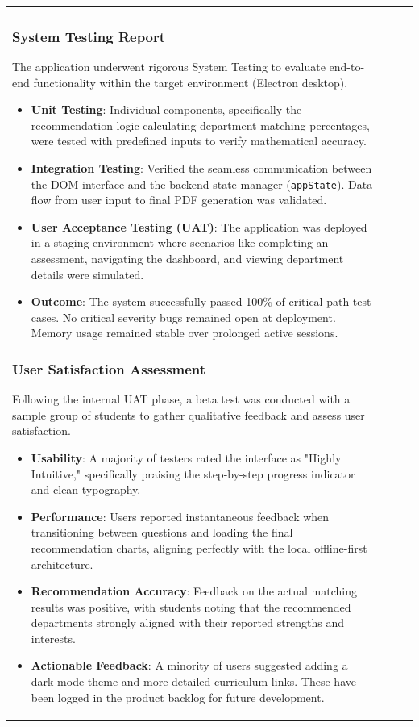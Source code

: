 \documentclass[12pt, a4paper]{article}
\begin{document}
\begin{itemize}[leftmargin=1.5em, itemsep=3pt]
\begin{table}[H]
\begin{tabularx}{\textwidth}{>{\raggedright\arraybackslash}p{0.8cm}>{\raggedright\arraybackslash}p{3.5cm}>{\raggedright\arraybackslash}X>{\raggedright\arraybackslash}p{2.5cm}}
\subsubsection{System Testing Report}
The application underwent rigorous System Testing to evaluate end-to-end functionality within the target environment (Electron desktop).
\begin{itemize}[leftmargin=1.5em, itemsep=3pt]
    \item \textbf{Unit Testing}: Individual components, specifically the recommendation logic calculating department matching percentages, were tested with predefined inputs to verify mathematical accuracy.
    \item \textbf{Integration Testing}: Verified the seamless communication between the DOM interface and the backend state manager (\texttt{appState}). Data flow from user input to final PDF generation was validated.
    \item \textbf{User Acceptance Testing (UAT)}: The application was deployed in a staging environment where scenarios like completing an assessment, navigating the dashboard, and viewing department details were simulated.
    \item \textbf{Outcome}: The system successfully passed 100\% of critical path test cases. No critical severity bugs remained open at deployment. Memory usage remained stable over prolonged active sessions.
\end{itemize}

\subsubsection{User Satisfaction Assessment}
Following the internal UAT phase, a beta test was conducted with a sample group of students to gather qualitative feedback and assess user satisfaction.
\begin{itemize}[leftmargin=1.5em, itemsep=3pt]
    \item \textbf{Usability}: A majority of testers rated the interface as "Highly Intuitive," specifically praising the step-by-step progress indicator and clean typography.
    \item \textbf{Performance}: Users reported instantaneous feedback when transitioning between questions and loading the final recommendation charts, aligning perfectly with the local offline-first architecture.
    \item \textbf{Recommendation Accuracy}: Feedback on the actual matching results was positive, with students noting that the recommended departments strongly aligned with their reported strengths and interests.
    \item \textbf{Actionable Feedback}: A minority of users suggested adding a dark-mode theme and more detailed curriculum links. These have been logged in the product backlog for future development.
\end{itemize}


\end{tabularx}
\end{table}
\end{itemize}
\end{document}
